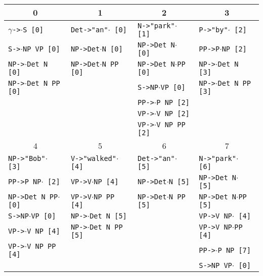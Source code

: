 \documentclass[a4paper]{article}
\begin{document}
\begin{enumerate}
\begin{enumerate}
\begin{enumerate}
\begin{itemize}
\begin{table}[ht]
\centering
\begin{tabular}{l|l|l|l}
\multicolumn{1}{c}{0} & \multicolumn{1}{c}{1} &\multicolumn{1}{c}{2} & \multicolumn{1}{c}{3} \\
\hline
$\gamma$\texttt{->}$\cdot$\texttt{S [0]} & \texttt{Det->"an"}$\cdot$\texttt{ [0]} & \texttt{N->"park"}$\cdot$\texttt{ [1]} & \texttt{P->"by"}$\cdot$\texttt{ [2]} \\
\texttt{S->}$\cdot$\texttt{NP VP [0]} & \texttt{NP->Det}$\cdot$\texttt{N [0]} & \texttt{NP->Det N}$\cdot$\texttt{ [0]} & \texttt{PP->P}$\cdot$\texttt{NP [2]} \\
\texttt{NP->}$\cdot$\texttt{Det N [0]} & \texttt{NP->Det}$\cdot$\texttt{N PP [0]} & \texttt{NP->Det N}$\cdot$\texttt{PP [0]} & \texttt{NP->}$\cdot$\texttt{Det N [3]} \\
\texttt{NP->}$\cdot$\texttt{Det N PP [0]} & & \texttt{S->NP}$\cdot$\texttt{VP [0]} & \texttt{NP->}$\cdot$\texttt{Det N PP [3]} \\
 & & \texttt{PP->}$\cdot$\texttt{P NP [2]} & \\
 & & \texttt{VP->}$\cdot$\texttt{V NP [2]} & \\
 & & \texttt{VP->}$\cdot$\texttt{V NP PP [2]} & \\
\hline
\multicolumn{1}{c}{4} & \multicolumn{1}{c}{5} & \multicolumn{1}{c}{6} & \multicolumn{1}{c}{7} \\
\hline
\texttt{NP->"Bob"}$\cdot$\texttt{ [3]} & \texttt{V->"walked"}$\cdot$\texttt{ [4]} & \texttt{Det->"an"}$\cdot$\texttt{ [5]} & \texttt{N->"park"}$\cdot$\texttt{ [6]} \\
\texttt{PP->P NP}$\cdot$\texttt{ [2]} & \texttt{VP->V}$\cdot$\texttt{NP [4]} & \texttt{NP->Det}$\cdot$\texttt{N [5]} & \texttt{NP->Det N}$\cdot$\texttt{ [5]} \\
\texttt{NP->Det N PP}$\cdot$\texttt{ [0]} & \texttt{VP->V}$\cdot$\texttt{NP PP [4]} & \texttt{NP->Det}$\cdot$\texttt{N PP [5]} & \texttt{NP->Det N}$\cdot$\texttt{PP [5]} \\
\texttt{S->NP}$\cdot$\texttt{VP [0]} & \texttt{NP->}$\cdot$\texttt{Det N [5]} & & \texttt{VP->V NP}$\cdot$\texttt{ [4]} \\
\texttt{VP->}$\cdot$\texttt{V NP [4]} & \texttt{NP->}$\cdot$\texttt{Det N PP [5]} & & \texttt{VP->V NP}$\cdot$\texttt{PP [4]} \\
\texttt{VP->}$\cdot$\texttt{V NP PP [4]} & & & \texttt{PP->}$\cdot$\texttt{P NP [7]} \\
 & & & \texttt{S->NP VP}$\cdot$\texttt{ [0]} \\

\end{tabular}
\end{table}
\end{itemize}
\end{enumerate}
\end{enumerate}
\end{enumerate}
\end{document}
